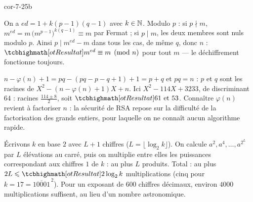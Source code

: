 \begin{blocLivre}{cor-7-25b}
\begin{corrigeSuite}
\begin{questions}[start=6]
  \item On a $ed=1+k(p-1)(q-1)$ avec $k\in\mathbb{N}$. Modulo $p$ : si
    $p\nmid m$, $m^{ed}=m\,\bigl(m^{p-1}\bigr)^{k(q-1)}\equiv m$ par Fermat ;
    si $p\mid m$, les deux membres sont nuls modulo $p$. Ainsi
    $p\mid m^{ed}-m$ dans tous les cas, de même $q$, donc $n$ :
    $\res{m^{ed}\equiv m\pmod n}$ pour tout $m$ — le déchiffrement
    fonctionne toujours.
  \item $n-\varphi(n)+1=pq-(pq-p-q+1)+1=p+q$ et $pq=n$ : $p$ et $q$ sont
    les racines de $X^{2}-(n-\varphi(n)+1)X+n$. Ici
    $X^{2}-114X+3233$, de discriminant $64$ : racines
    $\frac{114\pm8}{2}$, soit $\res{61\text{ et }53}$. Connaître
    $\varphi(n)$ revient à factoriser $n$ : la sécurité de RSA repose sur
    la difficulté de la factorisation des grands entiers, pour laquelle
    on ne connaît aucun algorithme rapide.
  \item Écrivons $k$ en base $2$ avec $L+1$ chiffres
    ($L=\lfloor\log_2k\rfloor$). On calcule $a^{2},a^{4},\dots,a^{2^{L}}$
    par $L$ élévations au carré, puis on multiplie entre elles les
    puissances correspondant aux chiffres $1$ de $k$ : au plus $L$
    produits. Total : au plus $2L\leqslant\res{2\log_2k}$ multiplications
    (cinq pour $k=17=\overline{10001}^{\,2}$). Pour un exposant de $600$
    chiffres décimaux, environ $4000$ multiplications suffisent, au lieu
    d'un nombre astronomique.
\end{questions}
\end{corrigeSuite}
\end{blocLivre}
